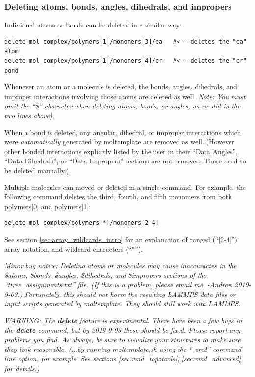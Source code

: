 \documentclass[11pt]{article}
\begin{document}
\subsubsection{Deleting atoms, bonds, angles, dihedrals, and impropers}
\label{sec:delete_atoms_bonds}
Individual atoms or bonds can be deleted in a similar way:
\begin{verbatim}
delete mol_complex/polymers[1]/monomers[3]/ca   #<-- deletes the "ca" atom
delete mol_complex/polymers[1]/monomers[4]/cr   #<-- deletes the "cr" bond
\end{verbatim}
Whenever an atom or a molecule is deleted, the bonds, angles, dihedrals, 
and improper interactions involving those atoms are deleted as well.
\textit{Note: You must omit the ``\$'' character when deleting atoms,
bonds, or angles, as we did in the two lines above).}



When a bond is deleted, any angular, dihedral, or improper 
interactions which were \textit{automatically} 
generated by moltemplate are removed as well.
(However other bonded interactions explicitly listed by the user in their
``Data Angles'', ``Data Dihedrals'', or ``Data Impropers'' sections
are not removed.  These need to be deleted manually.)

Multiple molecules can moved or deleted in a single command.  For example,
the following command deletes the third, fourth, and fifth monomers from 
both polymers[0] and polymers[1]:
\begin{verbatim}
delete mol_complex/polymers[*]/monomers[2-4]
\end{verbatim}
See section \ref{sec:array_wildcards_intro} for an
explanation of ranged (``[2-4]'') array notation, 
and wildcard characters (``*'').

\textit{Minor bug notice: 
Deleting atoms or molecules may cause 
inaccuracies in the \$atoms, \$bonds, \$angles, \$dihedrals, and \$impropers
sections of the ``ttree\_assignments.txt'' file.
(If this is a problem, please email me. -Andrew 2019-9-03.)
Fortunately, this should not harm the resulting LAMMPS data files or input
scripts generated by moltemplate.  They should still work with LAMMPS.}

\textit{WARNING: The \textbf{delete} feature is experimental.
There have been a few bugs in the \textbf{delete} command, but by 2019-9-03
these should be fixed.  Please report any problems you find.
As always, be sure to visualize your structures 
to make sure they look reasonable.
(...by running moltemplate.sh using the 
 ``-vmd'' command line option, for example.
 See sections \ref{sec:vmd_topotools}, \ref{sec:vmd_advanced} for details.)}
\end{document}
